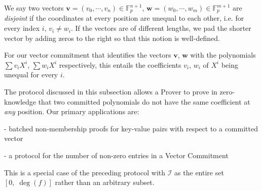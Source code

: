 \documentclass[11pt, lettersize, notitlepage, leqno, footskip=0.6cm]{article}
\newcommand{\bFp}{\mathbb{F}_p}
\newcommand{\mc}{\mathcal}
\newcommand{\mbf}{\mathbf}
\newcommand{\noin}{\noindent}
\numberwithin{equation}{section}
\begin{document}
We say two vectors $\mbf{v} = (v_0,\cdots,v_n)\in \bFp^{n+1}$, $\mbf{w}  = (w_0,\cdots,w_m)\in \bFp^{m+1}$ are \textit{disjoint} if the coordinates at every position are unequal to each other, i.e. for every index $i$, $v_i\neq w_i$. If the vectors are of different lengths, we pad the shorter vector by adding zeros to the right so that this notion is well-defined.  

For our vector commitment that identifies the vectors $\mbf{v}$, $\mbf{w}$ with the polynomials $\sum v_i X^i$, $\sum w_i X^i$ respectively, this entails the coefficients $v_i$, $w_i$ of $X^i$ being unequal for every $i$.

The protocol discussed in this subsection allows a Prover to prove in zero-knowledge that two committed polynomials do not have the same coefficient at \textit{any} position. Our primary applications are: \vspace{2mm}

\noin - batched non-membership proofs for key-value pairs with respect to a committed vector \vspace{1mm}

\noin  - a protocol for the number of non-zero entries in a Vector Commitment \vspace{2mm}


This is a special case of the preceding protocol with $\mc{I}$ as the entire set $[0,\;\deg(f)]$ rather than an arbitrary subset.
\end{document}
